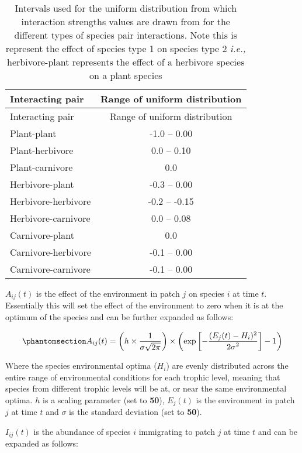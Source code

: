 \documentclass[
]{agujournal2019}
\begin{document}
\begin{longtable}[]{@{}lc@{}}
\caption{Intervals used for the uniform distribution from which
interaction strengths values are drawn from for the different types of
species pair interactions. Note this is represent the effect of species
type 1 on species type 2 \emph{i.e.,} herbivore-plant represents the
effect of a herbivore species on a plant
species}\label{tbl-interaction_strength}\tabularnewline
\toprule\noalign{}
Interacting pair & Range of uniform distribution \\
\midrule\noalign{}
\endfirsthead
\toprule\noalign{}
Interacting pair & Range of uniform distribution \\
\midrule\noalign{}
\endhead
\bottomrule\noalign{}
\endlastfoot
Plant-plant & -1.0 -- 0.00 \\
Plant-herbivore & 0.0 -- 0.10 \\
Plant-carnivore & 0.0 \\
Herbivore-plant & -0.3 -- 0.00 \\
Herbivore-herbivore & -0.2 -- -0.15 \\
Herbivore-carnivore & 0.0 -- 0.08 \\
Carnivore-plant & 0.0 \\
Carnivore-herbivore & -0.1 -- 0.00 \\
Carnivore-carnivore & -0.1 -- 0.00 \\
\end{longtable}

\(A_{ij}(t)\) is the effect of the environment in patch \(j\) on species
\(i\) at time \(t\). Essentially this will set the effect of the
environment to zero when it is at the optimum of the species and can be
further expanded as follows:

\begin{equation}\phantomsection\label{eq-metacomm_env}{
A_{ij}(t)=\left(h\times\frac{1}{\sigma\sqrt{2\pi}}\right)\times\left(\text{exp}\left[-\frac{(E_{j}(t)-H_{i})^2}{{2\sigma}^2}\right]-1\right)
}\end{equation}

Where the species environmental optima (\(H_i\)) are evenly distributed
across the entire range of environmental conditions for each trophic
level, meaning that species from different trophic levels will be at, or
near the same environmental optima. \(h\) is a scaling parameter (set to
\textbf{50}), \(E_j(t)\) is the environment in patch \(j\) at time \(t\)
and \(\sigma\) is the standard deviation (set to \textbf{50}).

\(I_{ij}(t)\) is the abundance of species \(i\) immigrating to patch
\(j\) at time \(t\) and can be expanded as follows:
\end{document}
